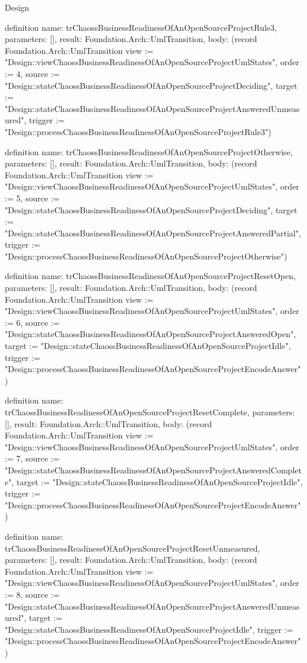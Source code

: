 \begin{lexlean}{Design}
\begin{semanticmodule}
definition{
  name: trChaossBusinessReadinessOfAnOpenSourceProjectRule3,
  parameters: [],
  result: Foundation.Arch::UmlTransition,
  body: (record Foundation.Arch::UmlTransition {view := "Design::viewChaossBusinessReadinessOfAnOpenSourceProjectUmlStates", order := 4, source := "Design::stateChaossBusinessReadinessOfAnOpenSourceProjectDeciding", target := "Design::stateChaossBusinessReadinessOfAnOpenSourceProjectAnsweredUnmeasured", trigger := "Design::processChaossBusinessReadinessOfAnOpenSourceProjectRule3"})
}

definition{
  name: trChaossBusinessReadinessOfAnOpenSourceProjectOtherwise,
  parameters: [],
  result: Foundation.Arch::UmlTransition,
  body: (record Foundation.Arch::UmlTransition {view := "Design::viewChaossBusinessReadinessOfAnOpenSourceProjectUmlStates", order := 5, source := "Design::stateChaossBusinessReadinessOfAnOpenSourceProjectDeciding", target := "Design::stateChaossBusinessReadinessOfAnOpenSourceProjectAnsweredPartial", trigger := "Design::processChaossBusinessReadinessOfAnOpenSourceProjectOtherwise"})
}

definition{
  name: trChaossBusinessReadinessOfAnOpenSourceProjectResetOpen,
  parameters: [],
  result: Foundation.Arch::UmlTransition,
  body: (record Foundation.Arch::UmlTransition {view := "Design::viewChaossBusinessReadinessOfAnOpenSourceProjectUmlStates", order := 6, source := "Design::stateChaossBusinessReadinessOfAnOpenSourceProjectAnsweredOpen", target := "Design::stateChaossBusinessReadinessOfAnOpenSourceProjectIdle", trigger := "Design::processChaossBusinessReadinessOfAnOpenSourceProjectEncodeAnswer"})
}

definition{
  name: trChaossBusinessReadinessOfAnOpenSourceProjectResetComplete,
  parameters: [],
  result: Foundation.Arch::UmlTransition,
  body: (record Foundation.Arch::UmlTransition {view := "Design::viewChaossBusinessReadinessOfAnOpenSourceProjectUmlStates", order := 7, source := "Design::stateChaossBusinessReadinessOfAnOpenSourceProjectAnsweredComplete", target := "Design::stateChaossBusinessReadinessOfAnOpenSourceProjectIdle", trigger := "Design::processChaossBusinessReadinessOfAnOpenSourceProjectEncodeAnswer"})
}

definition{
  name: trChaossBusinessReadinessOfAnOpenSourceProjectResetUnmeasured,
  parameters: [],
  result: Foundation.Arch::UmlTransition,
  body: (record Foundation.Arch::UmlTransition {view := "Design::viewChaossBusinessReadinessOfAnOpenSourceProjectUmlStates", order := 8, source := "Design::stateChaossBusinessReadinessOfAnOpenSourceProjectAnsweredUnmeasured", target := "Design::stateChaossBusinessReadinessOfAnOpenSourceProjectIdle", trigger := "Design::processChaossBusinessReadinessOfAnOpenSourceProjectEncodeAnswer"})
}


\end{semanticmodule}
\end{lexlean}
